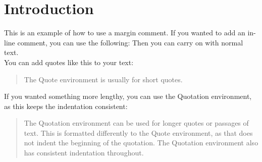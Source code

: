 \chapter{Introduction}\label{chap:intro}

This is an example of how to use a margin comment. If you wanted to add an in-line comment, you can use the following:  Then you can carry on with normal text.\\


\noindent You can add quotes like this to your text:
\begin{quote}
The Quote environment is usually for short quotes.
\end{quote}

If you wanted something more lengthy, you can use the Quotation environment, as this keeps the indentation consistent:

\begin{quotation}
The Quotation environment can be used for longer quotes or passages of text. This is formatted differently to the Quote environment, as that does not indent the beginning of the quotation. The Quotation environment also has consistent indentation throughout.
\end{quotation}